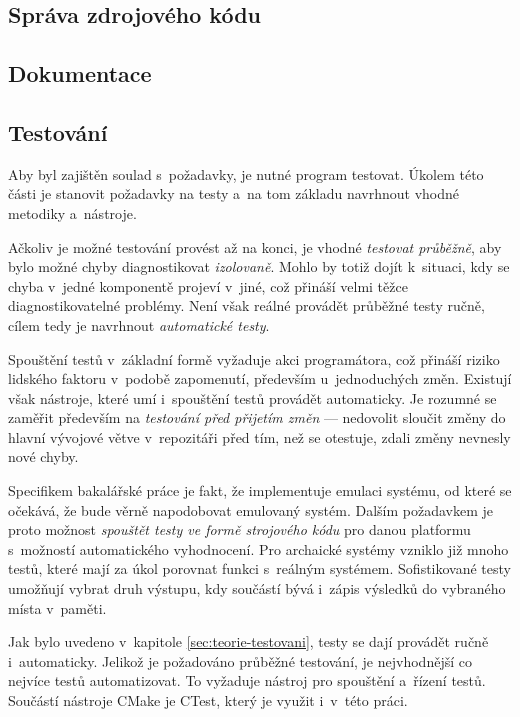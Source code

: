 \subsection{Správa zdrojového kódu}

\subsection{Dokumentace}

\subsection{Testování}
Aby byl zajištěn soulad s~požadavky, je nutné program testovat. Úkolem této části je stanovit požadavky na testy a~na tom základu navrhnout vhodné metodiky a~nástroje.

Ačkoliv je možné testování provést až na konci, je vhodné \emph{testovat průběžně}, aby bylo možné chyby diagnostikovat \emph{izolovaně}. Mohlo by totiž dojít k~situaci, kdy se chyba v~jedné komponentě projeví v~jiné, což přináší velmi těžce diagnostikovatelné problémy. Není však reálné provádět průběžné testy ručně, cílem tedy je navrhnout \emph{automatické testy}.

Spouštění testů v~základní formě vyžaduje akci programátora, což přináší riziko lidského faktoru v~podobě zapomenutí, především u~jednoduchých změn. Existují však nástroje, které umí i~spouštění testů provádět automaticky. Je rozumné se zaměřit především na \emph{testování před přijetím změn} --- nedovolit sloučit změny do hlavní vývojové větve v~repozitáři před tím, než se otestuje, zdali změny nevnesly nové chyby.

Specifikem bakalářské práce je fakt, že implementuje emulaci systému, od které se očekává, že bude věrně napodobovat emulovaný systém. Dalším požadavkem je proto možnost \emph{spouštět testy ve formě strojového kódu} pro danou platformu s~možností automatického vyhodnocení. Pro archaické systémy vzniklo již mnoho testů, které mají za úkol porovnat funkci s~reálným systémem. Sofistikované testy umožňují vybrat druh výstupu, kdy součástí bývá i~zápis výsledků do vybraného místa v~paměti.

Jak bylo uvedeno v~kapitole \ref{sec:teorie-testovani}, testy se dají provádět ručně i~automaticky. Jelikož je požadováno průběžné testování, je nejvhodnější co nejvíce testů automatizovat. To vyžaduje nástroj pro spouštění a~řízení testů. Součástí nástroje CMake je CTest, který je využit i~v~této práci.

